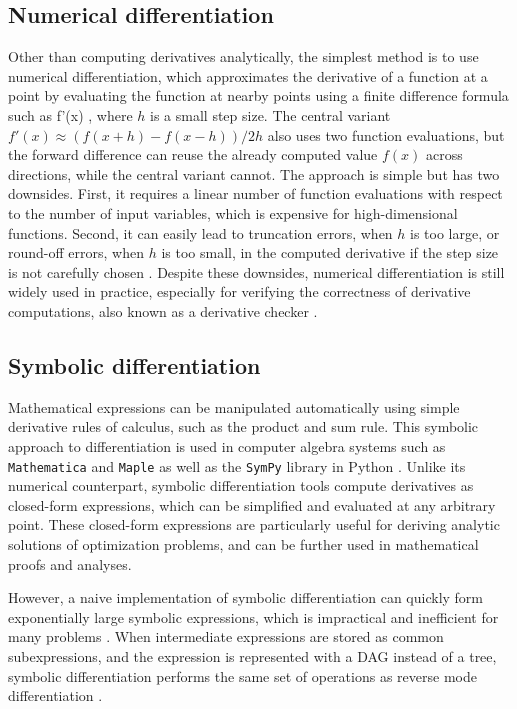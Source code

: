 \subsection{Numerical differentiation}\label{sec:bg-numerical-diff}
Other than computing derivatives analytically, the simplest method is to use numerical
differentiation, which approximates the derivative of a function at a point by evaluating the
function at nearby points using a finite difference formula such as
\BEQ
f'(x) \approx {},
\EEQ
where $h$ is a small step size.
The central variant $f'(x) \approx (f(x+h) - f(x-h)) / 2h$ also uses two function
evaluations, but the forward difference can reuse the already computed value $f(x)$ across
directions, while the central variant cannot.
The approach is simple but has two downsides.
First, it requires a linear number of function evaluations with respect to the number of
input variables, which is expensive for high-dimensional functions.
Second, it can easily lead to truncation errors, when $h$ is too large, or
round-off errors, when $h$ is too small, in the computed derivative if the step size is
not carefully chosen \cite{chakravarti1961truncation}.
Despite these downsides, numerical differentiation is still widely used in practice,
especially for verifying the correctness of derivative computations, also known as a
derivative checker \cite{wolfe1982checking}.

\subsection{Symbolic differentiation}\label{sec:bg-symbolic-diff}
Mathematical expressions can be manipulated automatically using simple derivative rules of
calculus, such as the product and sum rule. This symbolic approach to differentiation
is used in computer algebra systems such as \texttt{Mathematica} \cite{mathematica} and
\texttt{Maple}
\cite{maple} as well as the \texttt{SymPy} library in Python \cite{sympy2017}.
Unlike its numerical counterpart, symbolic differentiation tools compute derivatives as
closed-form expressions, which can be simplified and evaluated at any arbitrary point.
These closed-form expressions are particularly useful for deriving analytic solutions of
optimization problems, and can be further used in mathematical proofs and analyses.

However, a naive implementation of symbolic differentiation can quickly form exponentially
large symbolic expressions, which is impractical and inefficient for many problems
\cite{griewank2008evaluating}.
When intermediate expressions are stored as common subexpressions, and
the expression is represented with a \ac{DAG} instead of a tree,
symbolic differentiation performs the same set of operations as reverse mode
differentiation \cite{Laue2019OnTE}.


